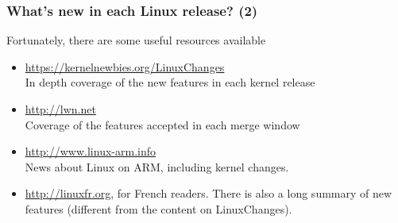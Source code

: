 \begin{frame}
  \frametitle{What's new in each Linux release? (2)}
  Fortunately, there are some useful resources available
  \begin{itemize}
    \item \url{https://kernelnewbies.org/LinuxChanges}\\
	In depth coverage of the new features in each kernel release
    \item \url{http://lwn.net}\\
	Coverage of the features accepted in each merge window
    \item \url{http://www.linux-arm.info}\\
	News about Linux on ARM, including kernel changes.
    \item \url{http://linuxfr.org}, for French readers.
	There is also a long summary of new features (different
	from the content on LinuxChanges).
  \end{itemize}
\end{frame}
